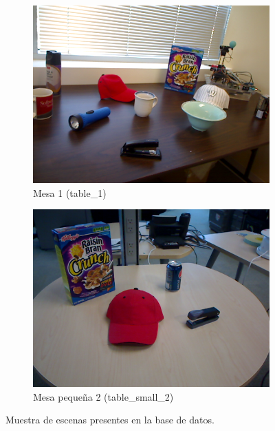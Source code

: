 \begin{figure}[t]
    \quad
    \begin{subfigure}[b]{0.4\textwidth}
		\centering
        \includegraphics[width=\textwidth]{img/base_rgbd/table_1.png}
        \caption{Mesa 1 (table\_1)}
		\label{fig:table_1}
    \end{subfigure}
	\quad
    \begin{subfigure}[b]{0.4\textwidth}
		\centering
        \includegraphics[width=\textwidth]{img/base_rgbd/table_small_2.png}
        \caption{Mesa pequeña 2 (table\_small\_2)}
		\label{fig:table_small_2}
    \end{subfigure}

    \caption{Muestra de escenas presentes en la base de datos.}
    \label{fig:ejemplo_escenas_base}
\end{figure}

